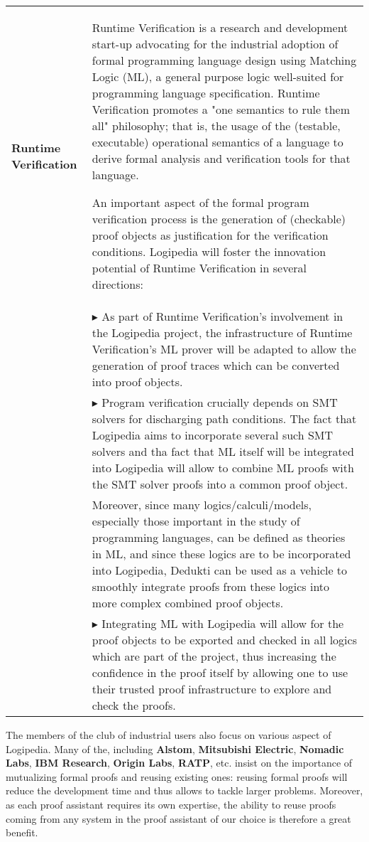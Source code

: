 \begin{longtable}{|p{}|p{}|}
\hline

{\bf Runtime Verification} &

Runtime Verification is a research and development start-up advocating for the industrial
adoption of formal programming language design using Matching Logic (ML), a
general purpose logic well-suited for programming language specification.
Runtime Verification promotes a "one semantics to rule them all" philosophy; that is, the usage
of the (testable, executable) operational semantics of a language to derive
formal analysis and verification tools for that language.

An important aspect of the formal program verification process is the
generation of (checkable) proof objects as justification for the verification
conditions.
Logipedia will foster the innovation potential of Runtime Verification in several directions:\\
&
$\blacktriangleright$
As part of Runtime Verification's involvement in the Logipedia project, the infrastructure of 
Runtime Verification's ML prover will be adapted to allow the generation of proof traces which
can be converted into proof objects.
\\
&
$\blacktriangleright$
Program verification crucially depends on SMT solvers for discharging
path conditions. The fact that Logipedia aims to incorporate several such SMT
solvers and tha fact that ML itself will be integrated into Logipedia will
allow to combine ML proofs with the SMT solver proofs into a common proof
object.\\

&
Moreover, since many logics/calculi/models, especially those important in the
study of programming languages, can be defined as theories in ML, and since
these logics are to be incorporated into Logipedia, Dedukti can be used as a
vehicle to smoothly integrate proofs from these logics into more complex
combined proof objects.\\
&
$\blacktriangleright$
Integrating ML with Logipedia will allow for the proof objects to be exported
and checked in all logics which are part of the project, thus increasing
the confidence in the proof itself by allowing one to use their trusted proof
infrastructure to explore and check the proofs.
\\
\hline
\end{longtable}

The members of the club of industrial users also focus on
various aspect of Logipedia. Many of the, including 
{\bf Alstom}, {\bf Mitsubishi Electric}, {\bf
  Nomadic Labs}, {\bf IBM Research},  {\bf Origin Labs}, {\bf RATP},
etc.  insist on the importance of mutualizing formal proofs and
reusing existing ones: reusing formal proofs will reduce
the development time and thus allows to tackle larger
problems. Moreover, as each proof assistant requires its own
expertise, the ability to reuse proofs coming from any system in the
proof assistant of our choice is therefore a great benefit.

